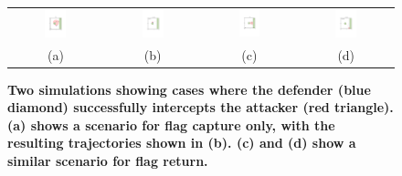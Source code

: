 \documentclass[letterpaper, 10 pt, conference]{ieeeconf}  %
\numberwithin{algorithm}{section}
\begin{document}
\begin{figure}
	\centering
	\begin{tabular}{cccc}
		\includegraphics[width=0.25\textwidth]{figures/defenderWinFC/defenderWinFC1.pdf} &
		\includegraphics[width=0.25\textwidth]{figures/defenderWinFC/defenderWinFC7.pdf} &
		\includegraphics[width=0.25\textwidth]{figures/defenderWinFR/defenderWinFR1.pdf} &
		\includegraphics[width=0.25\textwidth]{figures/defenderWinFR/defenderWinFR4.pdf} \\
		(a) & (b) & (c) & (d)  \\
	\end{tabular} 
	\caption{\textbf{Two simulations showing cases where the defender (blue diamond) successfully intercepts the attacker (red triangle).  (a) shows a scenario for flag capture only, with the resulting trajectories shown in (b).  (c) and (d) show a similar scenario for flag return.}}
	\label{fig:defenderWin}
\end{figure} 
\setlength\tabcolsep{6pt}
\end{document}
